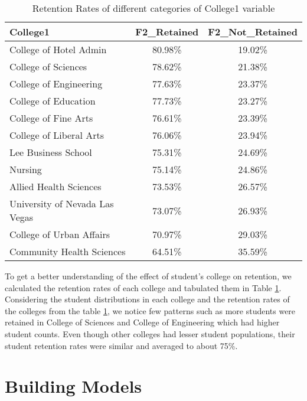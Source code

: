 \documentclass[11pt,openright]{report}
\begin{document}
\begin{table}
	\renewcommand{\arraystretch}{1.3}
	\caption{Retention Rates of different categories of College1 variable}
	\label{table:college_retentions}
	\centering
	\begin{tabular}{|l|c|c|}
		\hline
		\bfseries College1 & \bfseries F2\_Retained & \bfseries F2\_Not\_Retained\\
		\hline
		College of Hotel Admin  & 80.98\%  & 19.02\% \\ \hline
		College of Sciences & 78.62\% &  21.38\% \\ \hline
		College of Engineering & 77.63\% & 23.37\% \\ \hline
		College of Education    &   77.73\% &  23.27\% \\ \hline
		College of Fine Arts &  76.61\%  & 23.39\% \\ \hline
		College of Liberal Arts & 76.06\% & 23.94\% \\ \hline
		Lee Business School  & 75.31\% &  24.69\% \\ \hline
		Nursing    &  75.14\%  & 24.86\% \\ \hline
		Allied Health Sciences  & 73.53\% &  26.57\% \\ \hline
		University of Nevada Las Vegas     & 73.07\% &  26.93\% \\ \hline
		College of Urban Affairs  &         70.97\% &  29.03\% \\ \hline
		Community Health Sciences         &    64.51\% & 35.59\% \\ \hline
	\end{tabular}
\end{table}


To get a better understanding of the effect of student's college on retention, we calculated the retention rates of each college and tabulated them in Table \ref{table:college_retentions}. Considering the student distributions in each college and the retention rates of the colleges from the table \ref{table:college_retentions}, we notice few patterns such as more students were retained in College of Sciences and College of Engineering which had higher student counts. Even though other colleges had lesser student populations, their student retention rates were similar and averaged to about 75\%.

\chapter{Building Models} \label{chapter:building_models}
\end{document}
